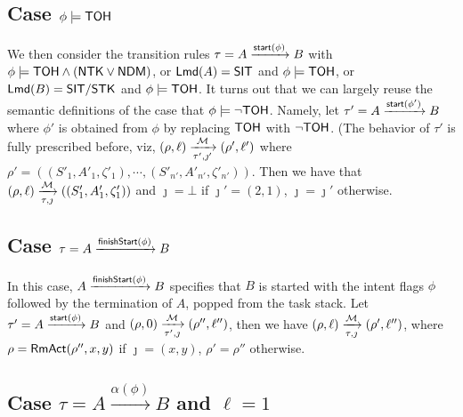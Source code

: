 {\begin{itemize}
\end{itemize}


\subsection*{Case $\phi \models {\sf TOH}$}
%
We then consider the transition rules $\tau =A \xrightarrow{{\mathsf{start} }(\phi)} B$ with $\phi \models {\sf TOH}\wedge({\sf NTK}\vee{\sf NDM})$, 
or ${\sf Lmd}(A) = {\sf SIT}$ and $\phi\models{\sf TOH}$,
or ${\sf Lmd}(B) = {\sf SIT}/{\sf STK}$ and $\phi\models{\sf TOH}$. It turns out that we can largely reuse the semantic definitions of the case that $\phi \models \neg {\sf TOH}$. Namely, 
let $\tau' = A \xrightarrow{{\mathsf{start} }(\phi')} B$ where $\phi'$ is obtained from $\phi$ by replacing ${\sf TOH}$ with $\neg {\sf TOH}$. (The behavior of $\tau'$ is fully prescribed before, viz, $(\rho,\ell) \xrightarrow[\tau',\jmath']{{\mathcal{M} }} (\rho',\ell')$ where $\rho' = ((S'_1, A'_1,\zeta'_1), \cdots, (S'_{n'}, A'_{n'},\zeta'_{n'}))$. Then we have that $(\rho,\ell) \xrightarrow[\tau,\jmath]{{\mathcal{M} }} ((S'_1, A'_1,\zeta'_1))$ and $\jmath = \bot$ if $\jmath' = (2,1)$, $\jmath = \jmath'$ otherwise.

\subsection{Case $\tau = A \xrightarrow{{\mathsf{finishStart} }(\phi)} B$}

In this case, $A\xrightarrow {{\mathsf{finishStart} }(\phi)}B$ specifies that $B$ is started with the intent flags $\phi$ followed by the termination of $A$, popped from the task stack. Let
$\tau' = A \xrightarrow {{\mathsf{start} }(\phi)}B$ and $(\rho,0) \xrightarrow[\tau',\jmath]{{\mathcal{M} }} (\rho'',\ell'')$, then we have $(\rho,\ell) \xrightarrow[\tau,\jmath]{{\mathcal{M} }} (\rho',\ell'')$, where $\rho = \mathsf{RmAct}(\rho'', x, y)$ if $\jmath = (x, y)$, $\rho' = \rho''$ otherwise.

\subsection{Case $\tau = A \xrightarrow{\alpha(\phi)} B$ and $\ell = 1$}

}
